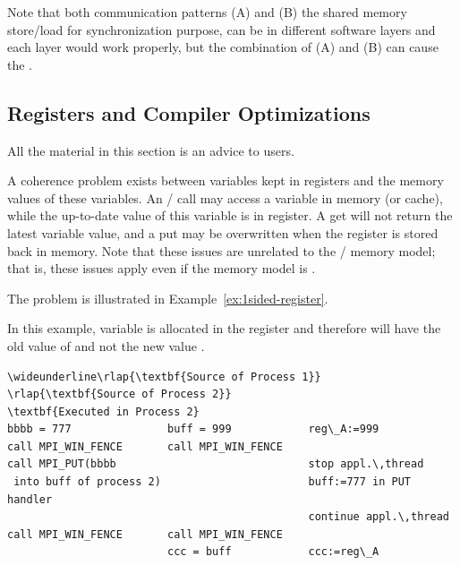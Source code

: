 Note that both communication patterns
(A) 
and
(B) the shared memory store/load for synchronization purpose,
can be in different software layers and each layer would work properly,
but the combination of (A) and (B) can cause the . 

\subsection{Registers and Compiler Optimizations}
\label{sec:onesided-optimizations}
\label{sec:rma-register-opt}

\begin{users}
All the material in this section is an advice to users.
\end{users}

A coherence problem exists between variables kept in registers
and the memory values of these variables.  An
\RMA/ call may access a 
variable in memory (or cache), while the up-to-date value of this
variable is in register.  A get will not return the latest variable
value, and a put may be overwritten when the register is stored back
in memory.  Note that these issues are unrelated to the \RMA/ memory 
model; that is, these issues apply even if the memory model is 
.

The problem is illustrated in Example~\ref{ex:1sided-register}.

\begin{example}
\label{ex:1sided-register}
%

In this example, variable  is allocated in the register
 and therefore
 will have the old value of  and not the new value
.

\begin{Verbatim}[commandchars=\\\{\}]
\wideunderline\rlap{\textbf{Source of Process 1}}                         \rlap{\textbf{Source of Process 2}}                      \textbf{Executed in Process 2}
bbbb = 777               buff = 999            reg\_A:=999
call MPI_WIN_FENCE       call MPI_WIN_FENCE
call MPI_PUT(bbbb                              stop appl.\,thread
 into buff of process 2)                       buff:=777 in PUT handler
                                               continue appl.\,thread
call MPI_WIN_FENCE       call MPI_WIN_FENCE
                         ccc = buff            ccc:=reg\_A
\end{Verbatim}
\lstset{fancyvrb=false}
\end{example}

